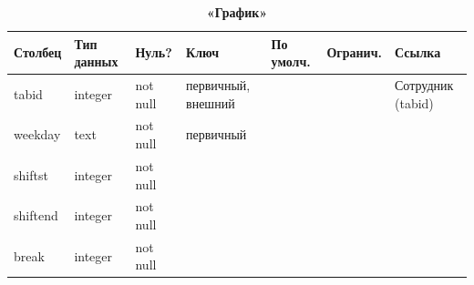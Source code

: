 \documentclass[14pt,a4paper,russian]{extreport}
\begin{document}
\begin{table}[h]
    \caption{ } 
    \begin{subtable}[t]{\textwidth}
        \caption{\textbf{«График»}}
    \begin{tabularx}{\textwidth}{| X | X | X | X | X | X | X |}
        \hline
        \textbf{Столбец} & \textbf{Тип данных} & \textbf{Нуль?} & \textbf{Ключ} & \textbf{По
        умолч.} & \textbf{Огранич.} & \textbf{Ссылка} \\ \hline
        tabid & integer & not null & первичный, внешний & & & Сотрудник (tabid) \\ \hline
        weekday & text & not null & первичный & & & \\ \hline
        shiftst & integer & not null & & & & \\ \hline
        shiftend & integer & not null & & & & \\ \hline
        break & integer & not null & & & & \\ \hline
    \end{tabularx}
    \end{subtable}
    \label{table:timetable}
\end{table}
\end{document}
